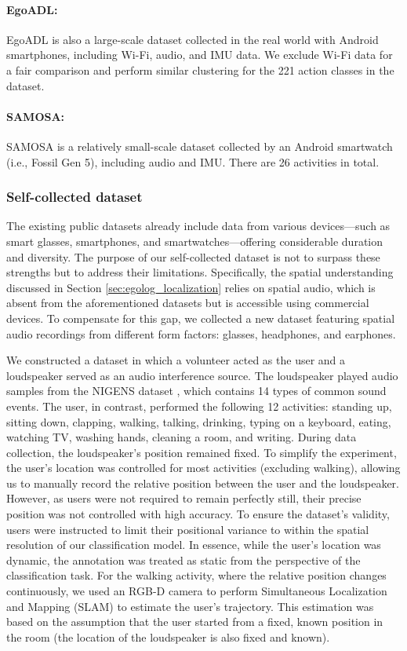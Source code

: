 \paragraph{EgoADL:}
EgoADL \citep{sun2024multimodal} is also a large-scale dataset collected in the real world with Android smartphones, including Wi-Fi, audio, and IMU data. We exclude Wi-Fi data for a fair comparison and perform similar clustering for the 221 action classes in the dataset.

\paragraph{SAMOSA:}
SAMOSA \citep{mollyn2022samosa} is a relatively small-scale dataset collected by an Android smartwatch (i.e., Fossil Gen 5), including audio and IMU. There are 26 activities in total.

\subsubsection{Self-collected dataset}
The existing public datasets already include data from various devices—such as smart glasses, smartphones, and smartwatches—offering considerable duration and diversity. The purpose of our self-collected dataset is not to surpass these strengths but to address their limitations. Specifically, the spatial understanding discussed in Section \ref{sec:egolog_localization} relies on spatial audio, which is absent from the aforementioned datasets but is accessible using commercial devices. To compensate for this gap, we collected a new dataset featuring spatial audio recordings from different form factors: glasses, headphones, and earphones.

We constructed a dataset in which a volunteer acted as the user and a loudspeaker served as an audio interference source. The loudspeaker played audio samples from the NIGENS dataset \citep{trowitzsch2019nigens}, which contains 14 types of common sound events. The user, in contrast, performed the following 12 activities: standing up, sitting down, clapping, walking, talking, drinking, typing on a keyboard, eating, watching TV, washing hands, cleaning a room, and writing.
During data collection, the loudspeaker's position remained fixed. To simplify the experiment, the user's location was controlled for most activities (excluding walking), allowing us to manually record the relative position between the user and the loudspeaker. However, as users were not required to remain perfectly still, their precise position was not controlled with high accuracy. To ensure the dataset's validity, users were instructed to limit their positional variance to within the spatial resolution of our classification model. In essence, while the user's location was dynamic, the annotation was treated as static from the perspective of the classification task.
For the walking activity, where the relative position changes continuously, we used an RGB-D camera to perform Simultaneous Localization and Mapping (SLAM) to estimate the user's trajectory. This estimation was based on the assumption that the user started from a fixed, known position in the room (the location of the loudspeaker is also fixed and known).


